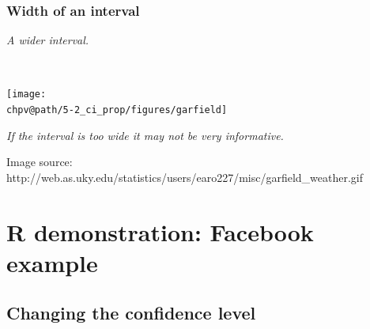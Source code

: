 \documentclass[t,compress,mathserif]{beamer}
\makeatletter
\newcommand{\soln}[1]{\textit{#1}}
\def\chpv@path{../../Chp 5}
\makeatother
\begin{document}
\begin{frame}
\frametitle{Width of an interval}


\pause

\soln{A wider interval.}

$\:$ \\

\pause

\begin{center}
\texttt{[image: \\chpv@path/5-2\_ci\_prop/figures/garfield]}
\end{center}

\pause

\soln{If the interval is too wide it may not be very informative.}

{\scriptsize Image source: http://web.as.uky.edu/statistics/users/earo227/misc/garfield\_weather.gif}

\end{frame}


\section{R demonstration: Facebook example}


\subsection{Changing the confidence level}

\end{document}
